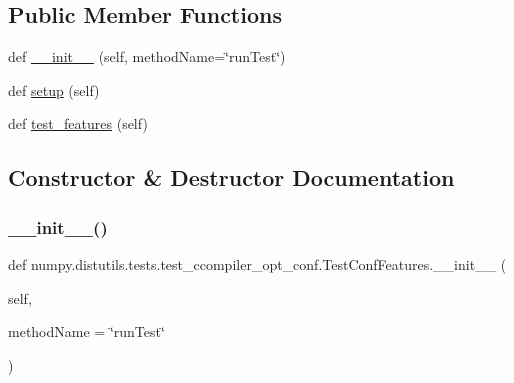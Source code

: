 \subsection*{Public Member Functions}
\begin{DoxyCompactItemize}
\item 
def \hyperlink{classnumpy_1_1distutils_1_1tests_1_1test__ccompiler__opt__conf_1_1TestConfFeatures_a16aad2ac8a657ed8d727c56f3108715e}{\+\_\+\+\_\+init\+\_\+\+\_\+} (self, method\+Name=\char`\"{}run\+Test\char`\"{})
\item 
def \hyperlink{classnumpy_1_1distutils_1_1tests_1_1test__ccompiler__opt__conf_1_1TestConfFeatures_ab92d9425a67996eabf3fa4eadf243a27}{setup} (self)
\item 
def \hyperlink{classnumpy_1_1distutils_1_1tests_1_1test__ccompiler__opt__conf_1_1TestConfFeatures_abe35c8a400bd6176e954fbb9366e3309}{test\+\_\+features} (self)
\end{DoxyCompactItemize}


\subsection{Constructor \& Destructor Documentation}
\mbox{\label{classnumpy_1_1distutils_1_1tests_1_1test__ccompiler__opt__conf_1_1TestConfFeatures_a16aad2ac8a657ed8d727c56f3108715e}} 
\subsubsection{\texorpdfstring{\+\_\+\+\_\+init\+\_\+\+\_\+()}{\_\_init\_\_()}}
{\footnotesize\ttfamily def numpy.\+distutils.\+tests.\+test\+\_\+ccompiler\+\_\+opt\+\_\+conf.\+Test\+Conf\+Features.\+\_\+\+\_\+init\+\_\+\+\_\+ (\begin{DoxyParamCaption}\item[{}]{self,  }\item[{}]{method\+Name = {\ttfamily \char`\"{}runTest\char`\"{}} }\end{DoxyParamCaption})}



